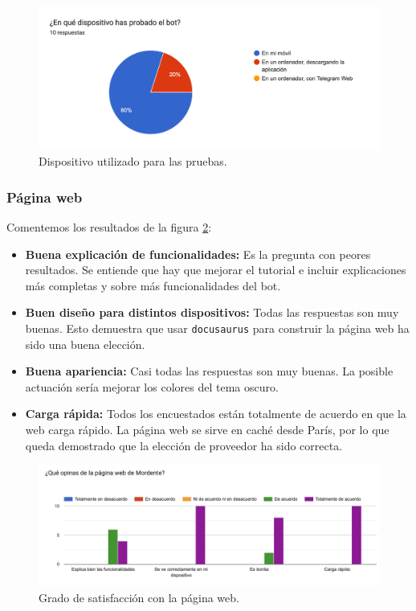 \begin{figure}[h]
\centering
\includegraphics[width=\textwidth]{imagenes/pruebas/dispositivo.png}
\caption{Dispositivo utilizado para las pruebas.}
\label{fig:graficoDispositivo}
\end{figure}

\subsubsection{Página web}

Comentemos los resultados de la figura \ref{fig:satisfaccionWeb}:

\begin{itemize}
    \item \textbf{Buena explicación de funcionalidades:} Es la pregunta con peores resultados. Se entiende que hay que mejorar el tutorial e incluir explicaciones más completas y sobre más funcionalidades del bot.
    \item \textbf{Buen diseño para distintos dispositivos:} Todas las respuestas son muy buenas. Esto demuestra que usar \texttt{docusaurus} para construir la página web ha sido una buena elección.
    \item \textbf{Buena apariencia:} Casi todas las respuestas son muy buenas. La posible actuación sería mejorar los colores del tema oscuro.
    \item \textbf{Carga rápida:} Todos los encuestados están totalmente de acuerdo en que la web carga rápido. La página web se sirve en caché desde París, por lo que queda demostrado que la elección de proveedor ha sido correcta.
\end{itemize}

\begin{figure}[h]
\centering
\includegraphics[width=\textwidth]{imagenes/pruebas/web.png}
\caption{Grado de satisfacción con la página web.}
\label{fig:satisfaccionWeb}
\end{figure}


